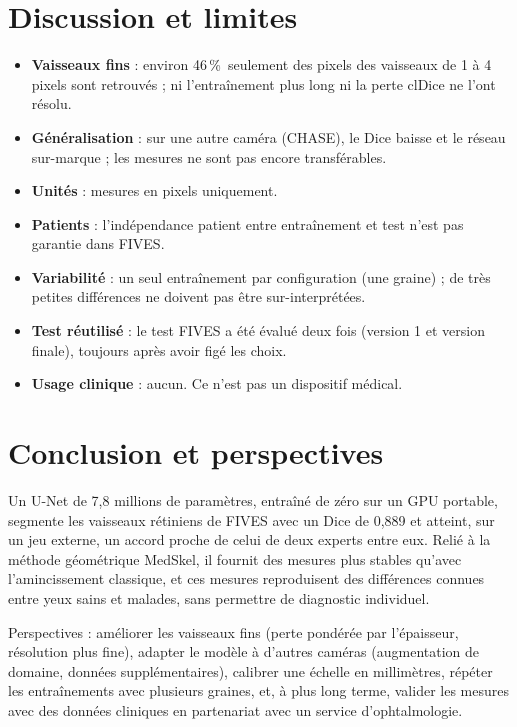 \documentclass[11pt,a4paper]{article}
\newcommand{\pct}{\,\%}
\begin{document}
\section{Discussion et limites}
\begin{itemize}
  \item \textbf{Vaisseaux fins} : environ 46\pct\ seulement des pixels des vaisseaux de 1 à 4 pixels sont retrouvés ; ni l'entraînement plus long ni la perte clDice ne l'ont résolu.
  \item \textbf{Généralisation} : sur une autre caméra (CHASE), le Dice baisse et le réseau sur-marque ; les mesures ne sont pas encore transférables.
  \item \textbf{Unités} : mesures en pixels uniquement.
  \item \textbf{Patients} : l'indépendance patient entre entraînement et test n'est pas garantie dans FIVES.
  \item \textbf{Variabilité} : un seul entraînement par configuration (une graine) ; de très petites différences ne doivent pas être sur-interprétées.
  \item \textbf{Test réutilisé} : le test FIVES a été évalué deux fois (version 1 et version finale), toujours après avoir figé les choix.
  \item \textbf{Usage clinique} : aucun. Ce n'est pas un dispositif médical.
\end{itemize}

\section{Conclusion et perspectives}
Un U-Net de 7,8 millions de paramètres, entraîné de zéro sur un GPU portable, segmente les vaisseaux rétiniens de FIVES avec un Dice de 0,889 et atteint, sur un jeu externe, un accord proche de celui de deux experts entre eux. Relié à la méthode géométrique MedSkel, il fournit des mesures plus stables qu'avec l'amincissement classique, et ces mesures reproduisent des différences connues entre yeux sains et malades, sans permettre de diagnostic individuel.

Perspectives : améliorer les vaisseaux fins (perte pondérée par l'épaisseur, résolution plus fine), adapter le modèle à d'autres caméras (augmentation de domaine, données supplémentaires), calibrer une échelle en millimètres, répéter les entraînements avec plusieurs graines, et, à plus long terme, valider les mesures avec des données cliniques en partenariat avec un service d'ophtalmologie.
\end{document}

